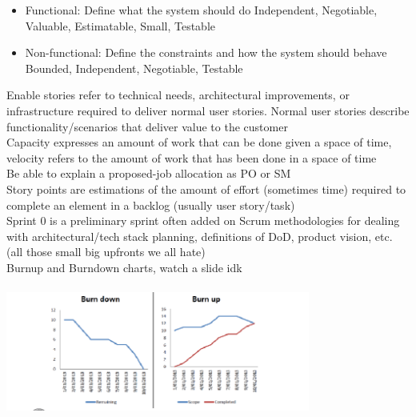 \documentclass[10pt]{article}
\begin{document}
\begin{itemize}
\item Functional:
Define what the system should do
Independent, Negotiable, Valuable, Estimatable, Small, Testable
\item Non-functional:
Define the constraints and how the system should behave
Bounded, Independent, Negotiable, Testable
\end{itemize}
Enable stories refer to technical needs, architectural improvements, or infrastructure required to deliver normal user stories. Normal user stories describe functionality/scenarios that deliver value to the customer\\
Capacity expresses an amount of work that can be done given a space of time, velocity refers to the amount of work that has been done in a space of time\\
Be able to explain a proposed-job allocation as PO or SM\\
Story points are estimations of the amount of effort (sometimes time) required to complete an element in a backlog (usually user story/task)\\
Sprint 0 is a preliminary sprint often added on Scrum methodologies for dealing with architectural/tech stack planning, definitions of DoD, product vision, etc. (all those small big upfronts we all hate)\\
Burnup and Burndown charts, watch a slide idk\\
\includegraphics[width=10cm, height=5cm]{Burndown}\\
\end{document}
